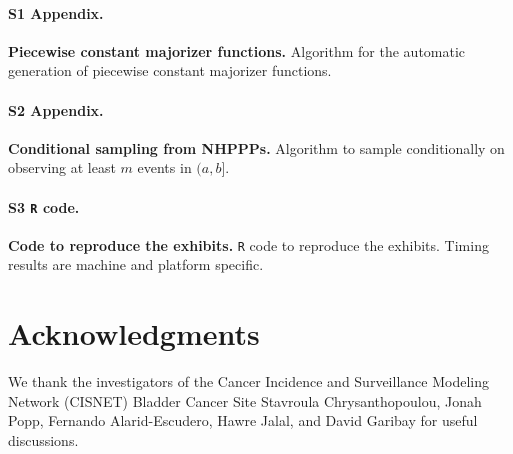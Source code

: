 \documentclass[10pt,letterpaper]{article}
\newcommand{\proglang}[1]{\texttt{#1}}
\begin{document}
\paragraph*{S1 Appendix.}
\label{S1_Appendix}
{\bf Piecewise constant majorizer functions.} Algorithm for the automatic generation of piecewise constant majorizer functions.

\paragraph*{S2 Appendix.}
\label{S2_Appendix}
{\bf Conditional sampling from NHPPPs.} Algorithm to sample conditionally on observing at least $m$ events in $(a, b]$.

\paragraph*{S3 \proglang{R} code.}
\label{S3_Code}
{\bf Code to reproduce the exhibits.} \proglang{R} code to reproduce the exhibits. Timing results are machine and platform specific.


\section*{Acknowledgments}
We thank the investigators of the Cancer Incidence and Surveillance Modeling Network (CISNET)
Bladder Cancer Site Stavroula Chrysanthopoulou, Jonah Popp, Fernando Alarid-Escudero,
Hawre Jalal, and David Garibay for useful discussions.

\nolinenumbers
\end{document}
